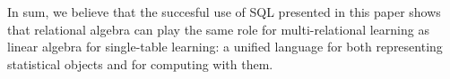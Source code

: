 \documentclass{acm_proc_article-sp}
\begin{document}
In sum, we believe that the succesful use of SQL presented in this paper shows that relational algebra can play the same role for multi-relational learning as linear algebra for single-table learning: a unified language for both representing statistical objects and for computing with them.

 



%






%
\end{document}
